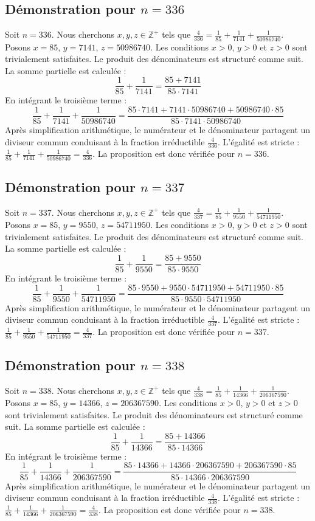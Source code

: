 \documentclass[11pt,a4paper]{article}
\begin{document}
\subsection{Démonstration pour $n = 336$}
Soit $n = 336$. Nous cherchons $x, y, z \in \mathbb{Z}^{+}$ tels que $\frac{4}{336} = \frac{1}{85} + \frac{1}{7141} + \frac{1}{50986740}$.
Posons $x = 85$, $y = 7141$, $z = 50986740$.
Les conditions $x > 0$, $y > 0$ et $z > 0$ sont trivialement satisfaites.
Le produit des dénominateurs est structuré comme suit. La somme partielle est calculée :
$$ \frac{1}{85} + \frac{1}{7141} = \frac{85+7141}{85 \cdot 7141} $$
En intégrant le troisième terme :
$$ \frac{1}{85} + \frac{1}{7141} + \frac{1}{50986740} = \frac{85 \cdot 7141 + 7141 \cdot 50986740 + 50986740 \cdot 85}{85 \cdot 7141 \cdot 50986740} $$
Après simplification arithmétique, le numérateur et le dénominateur partagent un diviseur commun conduisant à la fraction irréductible $\frac{4}{336}$.
L'égalité est stricte : $\frac{1}{85} + \frac{1}{7141} + \frac{1}{50986740} = \frac{4}{336}$.
La proposition est donc vérifiée pour $n = 336$.
\subsection{Démonstration pour $n = 337$}
Soit $n = 337$. Nous cherchons $x, y, z \in \mathbb{Z}^{+}$ tels que $\frac{4}{337} = \frac{1}{85} + \frac{1}{9550} + \frac{1}{54711950}$.
Posons $x = 85$, $y = 9550$, $z = 54711950$.
Les conditions $x > 0$, $y > 0$ et $z > 0$ sont trivialement satisfaites.
Le produit des dénominateurs est structuré comme suit. La somme partielle est calculée :
$$ \frac{1}{85} + \frac{1}{9550} = \frac{85+9550}{85 \cdot 9550} $$
En intégrant le troisième terme :
$$ \frac{1}{85} + \frac{1}{9550} + \frac{1}{54711950} = \frac{85 \cdot 9550 + 9550 \cdot 54711950 + 54711950 \cdot 85}{85 \cdot 9550 \cdot 54711950} $$
Après simplification arithmétique, le numérateur et le dénominateur partagent un diviseur commun conduisant à la fraction irréductible $\frac{4}{337}$.
L'égalité est stricte : $\frac{1}{85} + \frac{1}{9550} + \frac{1}{54711950} = \frac{4}{337}$.
La proposition est donc vérifiée pour $n = 337$.
\subsection{Démonstration pour $n = 338$}
Soit $n = 338$. Nous cherchons $x, y, z \in \mathbb{Z}^{+}$ tels que $\frac{4}{338} = \frac{1}{85} + \frac{1}{14366} + \frac{1}{206367590}$.
Posons $x = 85$, $y = 14366$, $z = 206367590$.
Les conditions $x > 0$, $y > 0$ et $z > 0$ sont trivialement satisfaites.
Le produit des dénominateurs est structuré comme suit. La somme partielle est calculée :
$$ \frac{1}{85} + \frac{1}{14366} = \frac{85+14366}{85 \cdot 14366} $$
En intégrant le troisième terme :
$$ \frac{1}{85} + \frac{1}{14366} + \frac{1}{206367590} = \frac{85 \cdot 14366 + 14366 \cdot 206367590 + 206367590 \cdot 85}{85 \cdot 14366 \cdot 206367590} $$
Après simplification arithmétique, le numérateur et le dénominateur partagent un diviseur commun conduisant à la fraction irréductible $\frac{4}{338}$.
L'égalité est stricte : $\frac{1}{85} + \frac{1}{14366} + \frac{1}{206367590} = \frac{4}{338}$.
La proposition est donc vérifiée pour $n = 338$.
\end{document}
